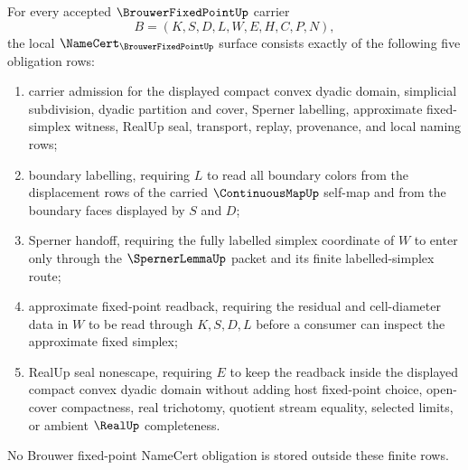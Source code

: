 \begin{theorem}
\label{thm:brouwer-fixed-point-namecert-obligations}
For every accepted $\BrouwerFixedPointUp$ carrier
$$
B=(K,S,D,L,W,E,H,C,P,N),
$$
the local $\NameCert_{\BrouwerFixedPointUp}$ surface consists exactly of the following five obligation rows:
\begin{enumerate}
\item carrier admission for the displayed compact convex dyadic domain, simplicial subdivision, dyadic partition and cover, Sperner labelling, approximate fixed-simplex witness, RealUp seal, transport, replay, provenance, and local naming rows;
\item boundary labelling, requiring $L$ to read all boundary colors from the displacement rows of the carried $\ContinuousMapUp$ self-map and from the boundary faces displayed by $S$ and $D$;
\item Sperner handoff, requiring the fully labelled simplex coordinate of $W$ to enter only through the $\SpernerLemmaUp$ packet and its finite labelled-simplex route;
\item approximate fixed-point readback, requiring the residual and cell-diameter data in $W$ to be read through $K,S,D,L$ before a consumer can inspect the approximate fixed simplex;
\item RealUp seal nonescape, requiring $E$ to keep the readback inside the displayed compact convex dyadic domain without adding host fixed-point choice, open-cover compactness, real trichotomy, quotient stream equality, selected limits, or ambient $\RealUp$ completeness.
\end{enumerate}
No Brouwer fixed-point NameCert obligation is stored outside these finite rows.
\end{theorem}
